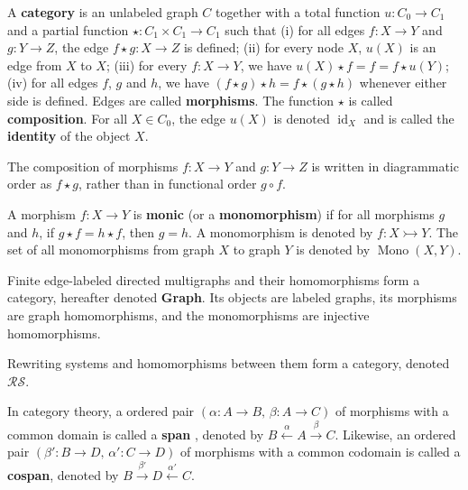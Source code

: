 \begin{definition}
    \label{def:cat}
    A \textbf{category} is an unlabeled graph \( C \) together with a total function \( u : C_0 \to C_1 \) and a partial function \( \star: C_1 \times C_1 \to C_1 \) such that 
        (i) for all edges \( f:X \to Y \) and \( g:Y \to Z \), the edge \( f \star g :X \to Z \) is defined; 
        (ii) for every node \( X \), \( u(X) \) is an edge from \( X \) to \( X \);
        (iii) for every \( f:X \to Y \), we have \(u(X) \star f = f = f \star u(Y)\);
        (iv) for all edges \( f \), \( g \) and \(h\), we have \( (f \star g) \star h = f \star (g \star h) \) whenever either side is defined.
    Edges are called \textbf{morphisms}. The function $\star$ is called \textbf{composition}. For all \( X \in C_0 \), the edge \( u(X) \) is denoted \( \operatorname{id}_X \) and is called the \textbf{identity} of the object \( X \).
\end{definition} 

\begin{notation}
    The composition of morphisms \( f : X \to Y \) and \( g : Y \to Z \) is written in diagrammatic order as \( f \star g \), rather than in functional order \( g \circ f \). 
\end{notation}  

\begin{definition}
    \label{def:cat:homo}
    A morphism \( f : X \to Y \) is \textbf{monic} (or a \textbf{monomorphism}) if for all morphisms \( g \) and \( h \), if \( g \star f = h \star f \), then \( g = h \). A monomorphism is denoted by \( f : X \rightarrowtail Y \). The set of all monomorphisms from graph \( X \) to graph \( Y \) is denoted by \( \operatorname{Mono}(X, Y) \).
\end{definition} 
\begin{example}
     Finite edge-labeled directed multigraphs and their homomorphisms form a category, hereafter denoted \textbf{Graph}. Its objects are labeled graphs, its morphisms are graph homomorphisms, and the monomorphisms are injective homomorphisms.
\end{example}
\begin{definition}
    Rewriting systems and homomorphisms between them form a category, denoted $\mathcal{RS}$.   
  \end{definition}
In category theory, a ordered pair \((\alpha : A \to B,\, \beta : A \to C)\) of morphisms with a common domain is called a \textbf{span} \cite{lowe2010graph}, denoted by
\(
B \overset{\alpha}{\leftarrow} A \overset{\beta}{\rightarrow} C.
\)
Likewise, an ordered pair \((\beta' : B \to D,\, \alpha' : C \to D)\) of morphisms with a common codomain is called a \textbf{cospan}, denoted by
\(
B \overset{\beta'}{\rightarrow} D \overset{\alpha'}{\leftarrow} C.
\)

